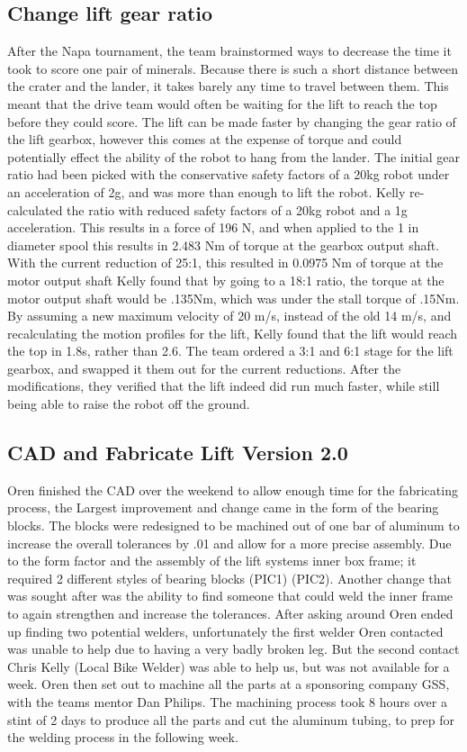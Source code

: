 \documentclass{article}
\begin{document}
\subsection{Change lift gear ratio}
After the Napa tournament, the team brainstormed ways to decrease the time it took to score one pair of minerals. 
Because there is such a short distance between the crater and the lander, it takes barely any time to travel between them. 
This meant that the drive team would often be waiting for the lift to reach the top before they could score.
The lift can be made faster by changing the gear ratio of the lift gearbox, however this comes at the expense of torque and could potentially effect the ability of the robot to hang from the lander.
The initial gear ratio had been picked with the conservative safety factors of a 20kg robot under an acceleration of 2g, and was more than enough to lift the robot. 
Kelly re-calculated the ratio with reduced safety factors of a 20kg robot and a 1g acceleration. 
This results in a force of 196 N, and when applied to the 1 in diameter spool this results in 2.483 Nm of torque at the gearbox output shaft.
With the current reduction of 25:1, this resulted in 0.0975 Nm of torque at the motor output shaft
Kelly found that by going to a 18:1 ratio, the torque at the motor output shaft would be .135Nm, which was under the stall torque of .15Nm.
By assuming a new maximum velocity of 20 m/s, instead of the old 14 m/s, and recalculating the motion profiles for the lift, Kelly found that the lift would reach the top in 1.8s, rather than 2.6.
The team ordered a 3:1 and 6:1 stage for the lift gearbox, and swapped it them out for the current reductions.
After the modifications, they verified that the lift indeed did run much faster, while still being able to raise the robot off the ground. 


\subsection{CAD and Fabricate Lift Version 2.0}
Oren finished the CAD over the weekend to allow enough time for the fabricating process, the Largest improvement and change came in the form of the bearing blocks. The blocks were redesigned to be machined out of one bar of aluminum to increase the overall tolerances by .01 and allow for a more precise assembly. Due to the form factor and the assembly of the lift systems inner box frame; it required 2 different styles of bearing blocks (PIC1) (PIC2). Another change that was sought after was the ability to find someone that could weld the inner frame to again strengthen and increase the tolerances. After asking around Oren ended up finding two potential welders, unfortunately the first welder Oren contacted was unable to help due to having a very badly broken leg. But the second contact Chris Kelly (Local Bike Welder) was able to help us, but was not available for a week. Oren then set out to machine all the parts at a sponsoring company GSS, with the teams mentor Dan Philips. The machining process took 8 hours over a stint of 2 days to produce all the parts and cut the aluminum tubing, to prep for the welding process in the following week. 
\end{document}
